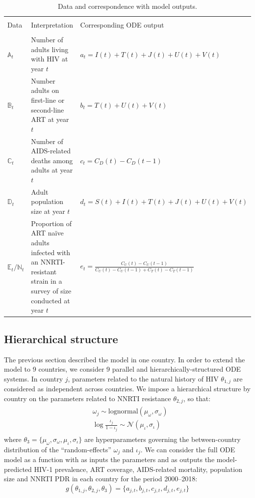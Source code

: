 \documentclass{article}
\begin{document}
	\begin{table}[H]
		\centering
		\caption{Data and correspondence with model outputs.}
		\label{table:transform}
		\begin{tabular}{lp{6.6cm}l}
			\hline \\[-.6em]
			Data &  Interpretation  & Corresponding ODE output \\[.2em]
			\hline \\[-.6em]
			$\mathds{A}_t$ & Number of adults living with HIV at year $t$  & $a_t = I(t)+T(t)+J(t)+U(t)+V(t)$\\[.3em]
			$\mathds{B}_t$ & Number adults on first-line or second-line ART at year $t$  & $b_t = T(t)+U(t)+V(t)$\\ [.3em]
			$\mathds{C}_t$ & Number of AIDS-related deaths among adults at year $t$  & $c_t = C_D(t)  - C_D(t-1)$\\ [.3em]
			$\mathds{D}_t$ & Adult population size  at year $t$  & $d_t = S(t)+I(t)+T(t)+J(t)+U(t)+V(t)$\\ [.6em]
			$\mathds{E}_t/\mathds{N}_t$ & Proportion of ART naïve adults infected with an NNRTI-resistant strain in a survey of size conducted at year $t$ & $e_t =  \frac{C_U(t)-C_U(t-1)}{C_U(t) -C_U(t-1) + C_T(t) - C_T(t-1)}$\\ [.4em]
			\hline 
		\end{tabular} 
	\end{table}
	
	
	\subsection{Hierarchical structure}
	
	The previous section described the model in one country.
	In order to extend the model to 9 countries, we consider 9 parallel and hierarchically-structured ODE systems.
	In country $j$, parameters related to the natural history of HIV $\theta_{1,j}$ are considered as independent across countries. 
	We impose a hierarchical structure by country on the parameters related to NNRTI resistance $\theta_{2,j}$, so that:
	\begin{align}
	\begin{split}
	&\omega_j \sim \text{lognormal}(\mu_{\omega},\sigma_{\omega}) \\
	&\log\frac{\iota_j}{1-\iota_j} \sim \mathcal{N}(\mu_{\iota},\sigma_{\iota})
	\end{split}
	\end{align}
	where $\theta_3 = \{\mu_{\omega},\sigma_{\omega},\mu_{\iota},\sigma_{\iota}\}$ are hyperparameters governing the between-country distribution of the ``random-effects'' $\omega_j$ and $\iota_j$.
	We can consider the full ODE model as a function with as inputs the parameters and as outputs the model-predicted HIV-1 prevalence, ART coverage, AIDS-related mortality, population size and NNRTI PDR in each country for the period 2000--2018:
	\begin{equation}
	g(\theta_{1,j},\theta_{2,j},\theta_3) = \{a_{j,t},b_{j,t},c_{j,t},d_{j,t},e_{j,t}\}
	\end{equation}
	
\end{document}
